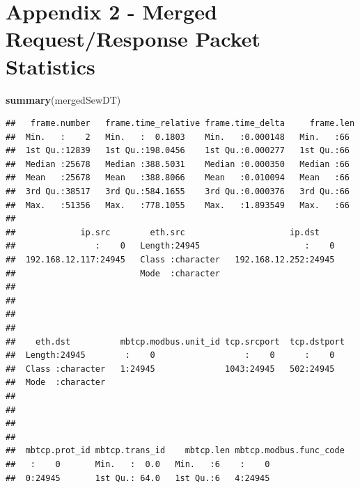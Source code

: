 \documentclass[]{article}
\newenvironment{Shaded}{\begin{snugshade}}{\end{snugshade}}
\newcommand{\KeywordTok}[1]{\textcolor[rgb]{0.13,0.29,0.53}{\textbf{{#1}}}}
\newcommand{\NormalTok}[1]{{#1}}
\begin{document}
\pagebreak

\section{Appendix 2 - Merged Request/Response Packet
Statistics}\label{appendix-2---merged-requestresponse-packet-statistics}

\begin{Shaded}
\begin{Highlighting}[]
\KeywordTok{summary}\NormalTok{(mergedSewDT)}
\end{Highlighting}
\end{Shaded}

\begin{verbatim}
##   frame.number   frame.time_relative frame.time_delta     frame.len 
##  Min.   :    2   Min.   :  0.1803    Min.   :0.000148   Min.   :66  
##  1st Qu.:12839   1st Qu.:198.0456    1st Qu.:0.000277   1st Qu.:66  
##  Median :25678   Median :388.5031    Median :0.000350   Median :66  
##  Mean   :25678   Mean   :388.8066    Mean   :0.010094   Mean   :66  
##  3rd Qu.:38517   3rd Qu.:584.1655    3rd Qu.:0.000376   3rd Qu.:66  
##  Max.   :51356   Max.   :778.1055    Max.   :1.893549   Max.   :66  
##                                                                     
##             ip.src        eth.src                     ip.dst     
##                :    0   Length:24945                     :    0  
##  192.168.12.117:24945   Class :character   192.168.12.252:24945  
##                         Mode  :character                         
##                                                                  
##                                                                  
##                                                                  
##                                                                  
##    eth.dst          mbtcp.modbus.unit_id tcp.srcport  tcp.dstport
##  Length:24945        :    0                  :    0      :    0  
##  Class :character   1:24945              1043:24945   502:24945  
##  Mode  :character                                                
##                                                                  
##                                                                  
##                                                                  
##                                                                  
##  mbtcp.prot_id mbtcp.trans_id    mbtcp.len mbtcp.modbus.func_code
##   :    0       Min.   :  0.0   Min.   :6    :    0               
##  0:24945       1st Qu.: 64.0   1st Qu.:6   4:24945               

\end{verbatim}
\end{document}
